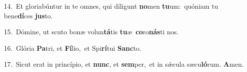 {\numbfont\textcolor{\numbcolor}{14.}}~Et gloriabúntur in te omnes, qui díligunt \textbf{no}\-men \textbf{tu}\-um:~\star quóniam tu bene\-\textbf{dí}\-ces \textbf{jus}\-to.\par
{\numbfont\textcolor{\numbcolor}{15.}}~Dómine, ut scuto bonæ volun\-\textbf{tá}\-tis \textbf{tu}\-æ~\star \textbf{co}\-ro\-\textbf{nás}\-ti nos.\par
{\numbfont\textcolor{\numbcolor}{16.}}~Glória \textbf{Pa}\-tri, et \textbf{Fí}\-lio,~\star et Spi\-\textbf{rí}\-tui \textbf{Sanc}\-to.\par
{\numbfont\textcolor{\numbcolor}{17.}}~Sicut erat in princípio, et \textbf{nunc}\-, et \textbf{sem}\-per,~\star et in sǽcula sæcu\-\textbf{ló}\-rum. \textbf{A}\-men.\par
